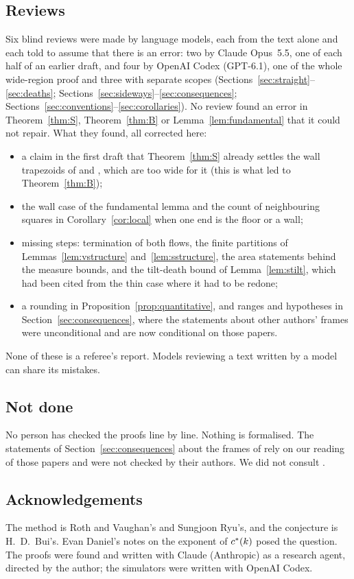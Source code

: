 \subsection*{Reviews}
Six blind reviews were made by language models, each from the text alone and each told to assume that there is an error: two by Claude Opus~5.5, one of each half of an earlier draft, and four by OpenAI Codex (GPT-6.1), one of the whole wide-region proof and three with separate scopes (Sections~\ref{sec:straight}--\ref{sec:deaths}; Sections~\ref{sec:sideways}--\ref{sec:consequences}; Sections~\ref{sec:conventions}--\ref{sec:corollaries}). No review found an error in Theorem~\ref{thm:S}, Theorem~\ref{thm:B} or Lemma~\ref{lem:fundamental} that it could not repair. What they found, all corrected here:
\begin{itemize}
\item a claim in the first draft that Theorem~\ref{thm:S} already settles the wall trapezoids of \cite{Bui25} and \cite{Ryu26}, which are too wide for it (this is what led to Theorem~\ref{thm:B});
\item the wall case of the fundamental lemma and the count of neighbouring squares in Corollary~\ref{cor:local} when one end is the floor or a wall;
\item missing steps: termination of both flows, the finite partitions of Lemmas~\ref{lem:vstructure} and~\ref{lem:sstructure}, the area statements behind the measure bounds, and the tilt-death bound of Lemma~\ref{lem:stilt}, which had been cited from the thin case where it had to be redone;
\item a rounding in Proposition~\ref{prop:quantitative}, and ranges and hypotheses in Section~\ref{sec:consequences}, where the statements about other authors' frames were unconditional and are now conditional on those papers.
\end{itemize}
None of these is a referee's report. Models reviewing a text written by a model can share its mistakes.

\subsection*{Not done}
No person has checked the proofs line by line. Nothing is formalised. The statements of Section~\ref{sec:consequences} about the frames of \cite{Bui25,McC26,Ryu26} rely on our reading of those papers and were not checked by their authors. We did not consult \cite{RV78}.

\subsection*{Acknowledgements}
The method is Roth and Vaughan's and Sungjoon Ryu's, and the conjecture is H.~D.~Bui's. Evan Daniel's notes on the exponent of $c^{*}(k)$ posed the question. The proofs were found and written with Claude (Anthropic) as a research agent, directed by the author; the simulators were written with OpenAI Codex.
